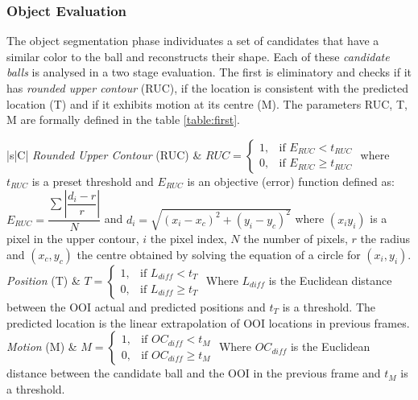\documentclass[a4paper]{article}
\begin{document}
\subsubsection{Object Evaluation}
The object segmentation phase individuates a set of candidates that have a similar color to the ball and reconstructs their shape. Each of these \textit{candidate balls} is analysed in a two stage evaluation. The first is eliminatory and checks if it has \textit{rounded upper contour} (RUC), if the location is consistent with the predicted location (T) and if it exhibits motion at its centre (M). The parameters RUC, T, M are formally defined in the table \ref{table:first}.

\begin{table}[!ht]
\begin{tabularx}{\textwidth}{|s|C|}
\hline
	\textit{Rounded Upper Contour} (RUC) &
	$ RUC= \begin{cases}
      1, &\text{if } E_{RUC} < t_{RUC} \\
      0, & \text{if } E_{RUC} \geq t_{RUC}
    \end{cases} $
    where $t_{RUC}$ is a preset threshold and $E_{RUC}$ is an objective (error) function defined as:
$ E_{RUC} = \dfrac{\sum{|\dfrac{d_{i}-r}{r}|}}{N} $ and $d_{i} = \sqrt{(x_{i} - x_{c})^2 + (y_{i} - y_{c})^2} $ where $(x_{i}y_{i})$ is a pixel in the upper contour, $i$ the pixel index, $N$ the number of pixels, $r$ the radius and $(x_{c},y_{c})$ the centre obtained by solving the equation of a circle for $(x_{i},y_{i})$.  \\ \hline
	\textit{Position} (T) &
	$ T= \begin{cases}
      1, &\text{if } L_{diff} < t_{T} \\
      0, & \text{if } L_{diff} \geq t_{T}
    \end{cases} $
    Where $L_{diff}$ is the Euclidean distance between the OOI actual and predicted positions and  $t_{T}$ is a threshold. The predicted location is the linear extrapolation of OOI locations in previous frames. \\ \hline
    \textit{Motion} (M) &
	$ M= \begin{cases}
      1, &\text{if } OC_{diff} < t_{M} \\
      0, & \text{if } OC_{diff} \geq t_{M}
    \end{cases} $
    Where $OC_{diff}$ is the Euclidean distance between the candidate ball and the OOI in the previous frame and  $t_{M}$ is a threshold. \\ \hline
\end{tabularx}
\caption{First Stage Evaluation}
\label{table:first}
\end{table}
\end{document}
